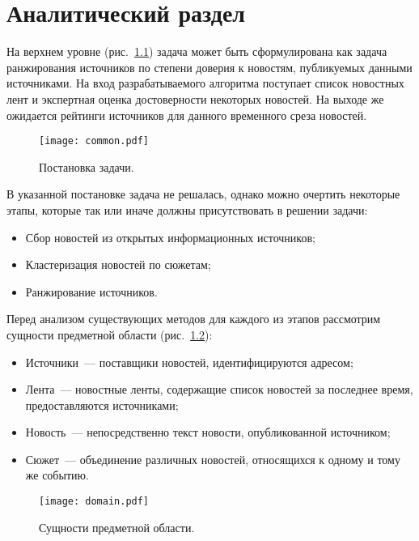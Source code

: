 \chapter{Аналитический раздел}
На верхнем уровне (рис.~\ref{fig:common}) задача может быть сформулирована как задача ранжирования источников по степени доверия к новостям, публикуемых данными источниками. На вход разрабатываемого алгоритма поступает список новостных лент и экспертная оценка достоверности некоторых новостей. На выходе же ожидается рейтинги источников для данного временного среза новостей.

\begin{figure}[h]
    \centering
    \texttt{[image: common.pdf]}
    \caption{Постановка задачи.}
    \label{fig:common}
\end{figure}

В указанной постановке задача не решалась, однако можно очертить некоторые этапы, которые так или иначе должны присутствовать в решении задачи:
\begin{itemize}
    \item Сбор новостей из открытых информационных источников;
    \item Кластеризация новостей по сюжетам;
    \item Ранжирование источников.
\end{itemize}

Перед анализом существующих методов для каждого из этапов рассмотрим сущности предметной области (рис.~\ref{fig:domain}):
\begin{itemize}
    \item Источники~--- поставщики новостей, идентифицируются адресом;
    \item Лента~--- новостные ленты, содержащие список новостей за последнее время, предоставляются источниками;
    \item Новость~--- непосредственно текст новости, опубликованной источником;
    \item Сюжет~--- объединение различных новостей, относящихся к одному и тому же событию.
\end{itemize}

\begin{figure}[h]
    \centering
    \texttt{[image: domain.pdf]}
    \caption{Сущности предметной области.}
    \label{fig:domain}
\end{figure}





